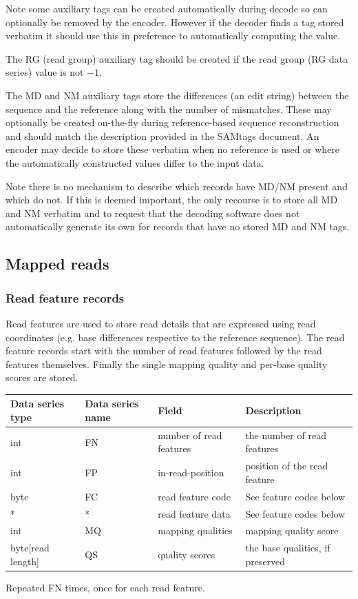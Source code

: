 \documentclass[a4paper]{article}
\begin{document}
Note some auxiliary tags can be created automatically during decode so can optionally be removed by the encoder.
However if the decoder finds a tag stored verbatim it should use this in preference to automatically computing the value.

The RG (read group) auxiliary tag should be created if the read group (RG data series) value is not $-1$.

The MD and NM auxiliary tags store the differences (an edit string) between the sequence and the reference along with the number of mismatches.
These may optionally be created on-the-fly during reference-based sequence reconstruction and should match the description provided in the SAMtags document.
An encoder may decide to store these verbatim when no reference is used or where the automatically constructed values differ to the input data.

Note there is no mechanism to describe which records have MD/NM present and which do not.
If this is deemed important, the only recourse is to store all MD and NM verbatim and to request that the decoding software does not automatically generate its own for records that have no stored MD and NM tags.

\subsection{\textbf{Mapped reads}}
\label{subsec:mapped}

\subsubsection*{\textbf{Read feature records}}
\label{subsec:features}

Read features are used to store read details that are expressed using read coordinates 
(e.g. base differences respective to the reference sequence). The read feature 
records start with the number of read features followed by the read features themselves.
Finally the single mapping quality and per-base quality scores are stored.

\begin{threeparttable}[t]
\begin{tabular}{|>{\raggedright}p{88pt}|>{\raggedright}p{83pt}|>{\raggedright}p{85pt}|>{\raggedright}p{180pt}|}
\hline
\textbf{Data series type} & \textbf{Data series name} & \textbf{Field} & \textbf{Description}\tabularnewline
\hline
int & FN & number of read features & the number of read features\tabularnewline
\hline
int & FP & in-read-position\tnote{a} & position of the read feature\tabularnewline 
\hline
byte & FC & read feature code\tnote{a} & See feature codes below\tabularnewline
\hline
* & * & read feature data\tnote{a} & See feature codes below\tabularnewline
\hline
int & MQ & mapping qualities & mapping quality score\tabularnewline
\hline
byte[read length] & QS & quality scores & the base qualities, if preserved\tabularnewline
\hline
\end{tabular}
\begin{tablenotes}
\item[a] Repeated FN times, once for each read feature.
\end{tablenotes}
\end{threeparttable}
\end{document}
